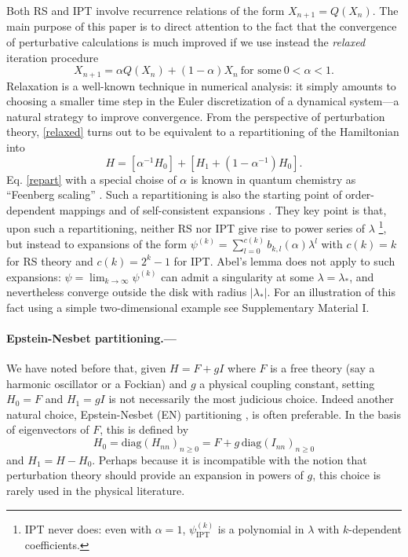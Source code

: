 \documentclass[aps,prl,reprint]{revtex4-2}
\begin{document}
    Both RS and IPT involve recurrence relations of the form $X_{n+1}=Q(X_n)$. The main purpose of this paper is to direct attention to the fact that the convergence of perturbative calculations is much improved if we use instead the \emph{relaxed} iteration procedure
    \begin{equation}\label{relaxed}
        X_{n+1} = \alpha Q(X_n) + (1-\alpha) X_n\ \textrm{for some}\ 0<\alpha<1.
    \end{equation}
    Relaxation is a well-known technique in numerical analysis: it simply amounts to choosing a smaller time step in the Euler discretization of a dynamical system---a natural strategy to improve convergence. From the perspective of perturbation theory, \eqref{relaxed} turns out to be  equivalent to a repartitioning of the Hamiltonian into
    \begin{equation}\label{repart}
       H = [\alpha^{-1} H_0] + [ H_1 + (1-\alpha^{-1})H_0].
    \end{equation}
    Eq. \eqref{repart} with a special choise of $\alpha$ is known in quantum chemistry as ``Feenberg scaling'' \cite{feenberg1958analysis,dietz1993acceleration, schmidt1993feenberg}. Such a repartitioning is also the starting point of order-dependent mappings \cite{seznec1979summation} and of self-consistent expansions \cite{schwartz1992nonlinear}. They key point is that, upon such a repartitioning, neither RS nor IPT give rise to power series of $\lambda$ \footnote{IPT never does: even with $\alpha =1$, $\psi^{(k)}_\textrm{IPT}$ is a polynomial in $\lambda$ with $k$-dependent coefficients.}, but instead to expansions of the form $\psi^{(k)}=\sum_{l=0}^{c(k)}b_{k,l}(\alpha)\lambda ^l$ with $c(k) = k$ for RS theory and $c(k)=2^{k}-1$ for IPT. Abel's lemma does not apply to such expansions: $\psi = \lim_{k\to\infty} \psi^{(k)}$ can admit a singularity at some $\lambda = \lambda_*$, and nevertheless converge outside the disk with radius $\vert \lambda_*\vert$. For an illustration of this fact using a simple two-dimensional example see Supplementary Material I.



    \paragraph{Epstein-Nesbet partitioning.---} We have noted before that, given $H = F + g I $ where $F$ is a free theory (say a harmonic oscillator or a Fockian) and $g$ a physical coupling constant, setting $H_0 = F$ and $H_1 = gI$ is not necessarily the most judicious choice. Indeed another natural choice, Epstein-Nesbet (EN) partitioning \cite{surjanAppendixStudiesPerturbation2004}, is often preferable. In the basis of eigenvectors of $F$, this is defined by
    \begin{equation}\label{EN}
	    H_0=\textrm{diag}(H_{nn})_{n\geq 0} = F + g\, \textrm{diag}(I_{nn})_{n\geq 0}
	\end{equation}
    and $H_1 = H-H_0$. Perhaps because it is incompatible with the notion that perturbation theory should provide an expansion in powers of $g$, this choice is rarely used in the physical literature.
\end{document}
